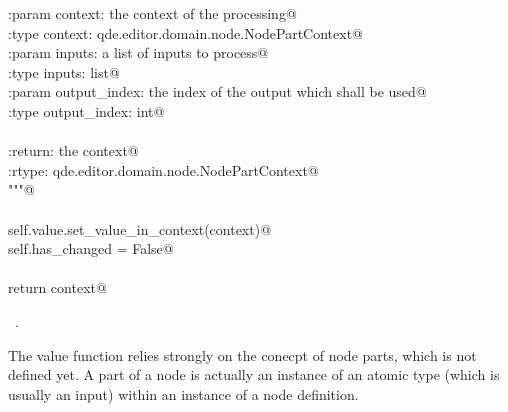 \documentclass[
    a4paper,      %
    10pt,         %
    openright,    %
    notitlepage,  %
    parskip=half, %
]{scrreprt}       %
\theoremstyle{definition}                    %
\begin{document}
\begin{flushleft}
\begin{minipage}{\linewidth}
\begin{list}{}{}
\mbox{}\lstinline@        :param context: the context of the processing@\\
\mbox{}\lstinline@        :type  context: qde.editor.domain.node.NodePartContext@\\
\mbox{}\lstinline@        :param inputs: a list of inputs to process@\\
\mbox{}\lstinline@        :type inputs: list@\\
\mbox{}\lstinline@        :param output_index: the index of the output which shall be used@\\
\mbox{}\lstinline@        :type output_index: int@\\
\mbox{}\lstinline@@\\
\mbox{}\lstinline@        :return: the context@\\
\mbox{}\lstinline@        :rtype:  qde.editor.domain.node.NodePartContext@\\
\mbox{}\lstinline@        """@\\
\mbox{}\lstinline@@\\
\mbox{}\lstinline@        self.value.set_value_in_context(context)@\\
\mbox{}\lstinline@        self.has_changed = False@\\
\mbox{}\lstinline@@\\
\mbox{}\lstinline@        return context@{\NWsep}
\end{list}
\vspace{-1.5ex}
\footnotesize
\begin{list}{}{\setlength{\itemsep}{-\parsep}\setlength{\itemindent}{-\leftmargin}}
\item \NWtxtMacroRefIn\ .

\item{}
\end{list}
\end{minipage}\vspace{4ex}
\end{flushleft}
The value function relies strongly on the conecpt of node parts, which is not
defined yet. A part of a node is actually an instance of an atomic type
(which is usually an input) within an instance of a node definition.
\end{document}
